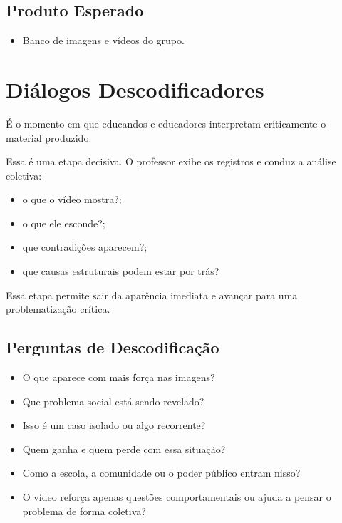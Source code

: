 \documentclass[
  letterpaper,
  DIV=11,
  numbers=noendperiod]{scrreport}
\providecommand{\tightlist}{%
  \setlength{\itemsep}{0pt}\setlength{\parskip}{0pt}}
\begin{document}
\subsection{Produto Esperado}\label{produto-esperado-3}

\begin{itemize}
\tightlist
\item
  Banco de imagens e vídeos do grupo.
\end{itemize}

\section{Diálogos Descodificadores}\label{diuxe1logos-descodificadores}

É o momento em que educandos e educadores interpretam criticamente o
material produzido.

Essa é uma etapa decisiva. O professor exibe os registros e conduz a
análise coletiva:

\begin{itemize}
\tightlist
\item
  o que o vídeo mostra?;
\item
  o que ele esconde?;
\item
  que contradições aparecem?;
\item
  que causas estruturais podem estar por trás?
\end{itemize}

Essa etapa permite sair da aparência imediata e avançar para uma
problematização crítica.

\subsection{Perguntas de
Descodificação}\label{perguntas-de-descodificauxe7uxe3o}

\begin{itemize}
\tightlist
\item
  O que aparece com mais força nas imagens?
\item
  Que problema social está sendo revelado?
\item
  Isso é um caso isolado ou algo recorrente?
\item
  Quem ganha e quem perde com essa situação?
\item
  Como a escola, a comunidade ou o poder público entram nisso?
\item
  O vídeo reforça apenas questões comportamentais ou ajuda a pensar o
  problema de forma coletiva?
\end{itemize}
\end{document}
